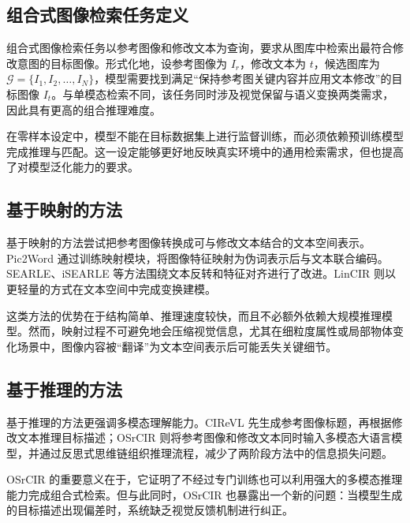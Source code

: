 \documentclass[12pt,a4paper,UTF8,oneside,openany]{ctexrep}
\begin{document}
\hypertarget{ux7ec4ux5408ux5f0fux56feux50cfux68c0ux7d22ux4efbux52a1ux5b9aux4e49}{%
\subsection{组合式图像检索任务定义}\label{ux7ec4ux5408ux5f0fux56feux50cfux68c0ux7d22ux4efbux52a1ux5b9aux4e49}}

组合式图像检索任务以参考图像和修改文本为查询，要求从图库中检索出最符合修改意图的目标图像。形式化地，设参考图像为
\(I_r\)，修改文本为 \(t\)，候选图库为
\(\mathcal{G}=\{I_1,I_2,\ldots,I_N\}\)，模型需要找到满足``保持参考图关键内容并应用文本修改''的目标图像
\(I_t\)。与单模态检索不同，该任务同时涉及视觉保留与语义变换两类需求，因此具有更高的组合推理难度。

在零样本设定中，模型不能在目标数据集上进行监督训练，而必须依赖预训练模型完成推理与匹配。这一设定能够更好地反映真实环境中的通用检索需求，但也提高了对模型泛化能力的要求。

\hypertarget{ux57faux4e8eux6620ux5c04ux7684ux65b9ux6cd5}{%
\subsection{基于映射的方法}\label{ux57faux4e8eux6620ux5c04ux7684ux65b9ux6cd5}}

基于映射的方法尝试把参考图像转换成可与修改文本结合的文本空间表示。Pic2Word
通过训练映射模块，将图像特征映射为伪词表示后与文本联合编码。SEARLE、iSEARLE
等方法围绕文本反转和特征对齐进行了改进。LinCIR
则以更轻量的方式在文本空间中完成变换建模。

这类方法的优势在于结构简单、推理速度较快，而且不必额外依赖大规模推理模型。然而，映射过程不可避免地会压缩视觉信息，尤其在细粒度属性或局部物体变化场景中，图像内容被``翻译''为文本空间表示后可能丢失关键细节。

\hypertarget{ux57faux4e8eux63a8ux7406ux7684ux65b9ux6cd5}{%
\subsection{基于推理的方法}\label{ux57faux4e8eux63a8ux7406ux7684ux65b9ux6cd5}}

基于推理的方法更强调多模态理解能力。CIReVL
先生成参考图像标题，再根据修改文本推理目标描述；OSrCIR
则将参考图像和修改文本同时输入多模态大语言模型，并通过反思式思维链组织推理流程，减少了两阶段方法中的信息损失问题。

OSrCIR
的重要意义在于，它证明了不经过专门训练也可以利用强大的多模态推理能力完成组合式检索。但与此同时，OSrCIR
也暴露出一个新的问题：当模型生成的目标描述出现偏差时，系统缺乏视觉反馈机制进行纠正。
\end{document}
